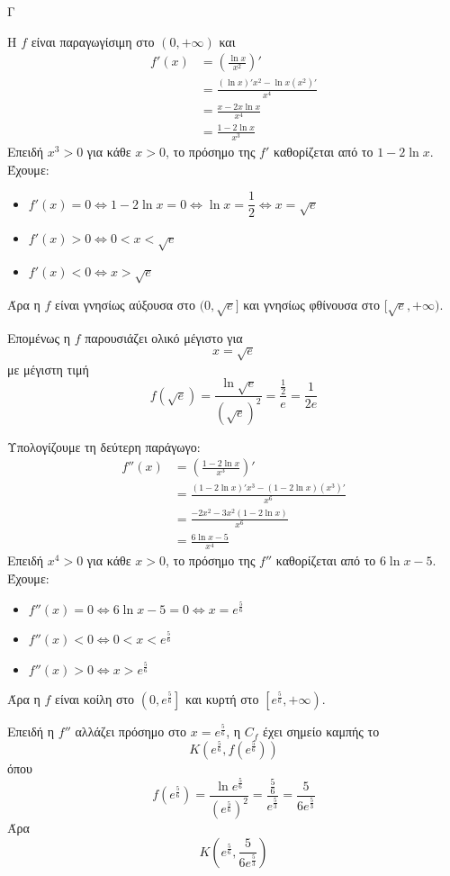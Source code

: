 \begin{thema}{Γ}
\begin{erwthma}
\item Η $f$ είναι παραγωγίσιμη στο $(0,+\infty)$ και
\begin{align*}
f'(x)
&=\left(\frac{\ln x}{x^2}\right)'\\
&=\frac{(\ln x)'x^2-\ln x(x^2)'}{x^4}\\
&=\frac{x-2x\ln x}{x^4}\\
&=\frac{1-2\ln x}{x^3}
\end{align*}
Επειδή $x^3>0$ για κάθε $x>0$, το πρόσημο της $f'$ καθορίζεται από το $1-2\ln x$.
Έχουμε:
\begin{itemize}
\item $f'(x)=0\Leftrightarrow 1-2\ln x=0\Leftrightarrow \ln x=\dfrac{1}{2}\Leftrightarrow x=\sqrt{e}$
\item $f'(x)>0\Leftrightarrow 0<x<\sqrt{e}$
\item $f'(x)<0\Leftrightarrow x>\sqrt{e}$
\end{itemize}
Άρα η $f$ είναι γνησίως αύξουσα στο $(0,\sqrt{e}]$ και γνησίως φθίνουσα στο $[\sqrt{e},+\infty)$.

Επομένως η $f$ παρουσιάζει ολικό μέγιστο για
\[x=\sqrt{e}\]
με μέγιστη τιμή
\[f(\sqrt{e})=\frac{\ln\sqrt{e}}{(\sqrt{e})^2}=\frac{\frac{1}{2}}{e}=\frac{1}{2e}\]

\item Υπολογίζουμε τη δεύτερη παράγωγο:
\begin{align*}
f''(x)
&=\left(\frac{1-2\ln x}{x^3}\right)'\\
&=\frac{\left(1-2\ln x\right)'x^3-\left(1-2\ln x\right)(x^3)'}{x^6}\\
&=\frac{-2x^2-3x^2(1-2\ln x)}{x^6}\\
&=\frac{6\ln x-5}{x^4}
\end{align*}
Επειδή $x^4>0$ για κάθε $x>0$, το πρόσημο της $f''$ καθορίζεται από το $6\ln x-5$.
Έχουμε:
\begin{itemize}
\item $f''(x)=0\Leftrightarrow 6\ln x-5=0\Leftrightarrow x=e^{\frac{5}{6}}$
\item $f''(x)<0\Leftrightarrow 0<x<e^{\frac{5}{6}}$
\item $f''(x)>0\Leftrightarrow x>e^{\frac{5}{6}}$
\end{itemize}
Άρα η $f$ είναι κοίλη στο $\left(0,e^{\frac{5}{6}}\right]$ και κυρτή στο $\left[e^{\frac{5}{6}},+\infty\right)$.

Επειδή η $f''$ αλλάζει πρόσημο στο $x=e^{\frac{5}{6}}$, η $C_f$ έχει σημείο καμπής το
\[
K\left(e^{\frac{5}{6}},f\left(e^{\frac{5}{6}}\right)\right)
\]
όπου
\[
f\left(e^{\frac{5}{6}}\right)
=\frac{\ln e^{\frac{5}{6}}}{\left(e^{\frac{5}{6}}\right)^2}
=\frac{\frac{5}{6}}{e^{\frac{5}{3}}}
=\frac{5}{6e^{\frac{5}{3}}}
\]
Άρα
\[
K\left(e^{\frac{5}{6}},\frac{5}{6e^{\frac{5}{3}}}\right)
\]


\end{erwthma}
\end{thema}
